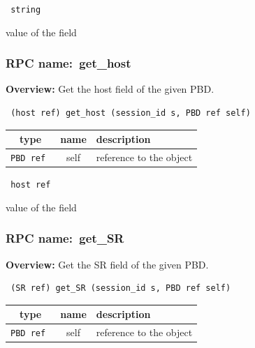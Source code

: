\vspace{0.3cm}

{\tt 
string
}


value of the field
\vspace{0.3cm}
\vspace{0.3cm}
\vspace{0.3cm}
\subsubsection{RPC name:~get\_host}

{\bf Overview:} 
Get the host field of the given PBD.

\begin{verbatim} (host ref) get_host (session_id s, PBD ref self)\end{verbatim}



 
\vspace{0.3cm}
\begin{tabular}{|c|c|p{7cm}|}
 \hline
{\bf type} & {\bf name} & {\bf description} \\ \hline
{\tt PBD ref } & self & reference to the object \\ \hline 

\end{tabular}

\vspace{0.3cm}

{\tt 
host ref
}


value of the field
\vspace{0.3cm}
\vspace{0.3cm}
\vspace{0.3cm}
\subsubsection{RPC name:~get\_SR}

{\bf Overview:} 
Get the SR field of the given PBD.

\begin{verbatim} (SR ref) get_SR (session_id s, PBD ref self)\end{verbatim}



 
\vspace{0.3cm}
\begin{tabular}{|c|c|p{7cm}|}
 \hline
{\bf type} & {\bf name} & {\bf description} \\ \hline
{\tt PBD ref } & self & reference to the object \\ \hline 

\end{tabular}

